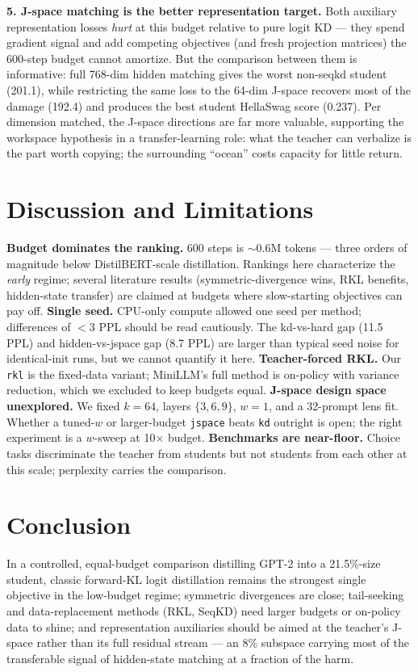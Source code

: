 \documentclass[11pt]{article}
\begin{document}
\textbf{5. J-space matching is the better representation target.} Both
auxiliary representation losses \emph{hurt} at this budget relative to
pure logit KD --- they spend gradient signal and add competing objectives
(and fresh projection matrices) the 600-step budget cannot amortize. But
the comparison between them is informative: full 768-dim hidden matching
gives the worst non-seqkd student (201.1), while restricting the same loss
to the 64-dim J-space recovers most of the damage (192.4) and produces
the best student HellaSwag score (0.237). Per dimension matched, the
J-space directions are far more valuable, supporting the workspace
hypothesis \cite{anthropic2026workspace} in a transfer-learning role:
what the teacher can verbalize is the part worth copying; the surrounding
``ocean'' costs capacity for little return.

\section{Discussion and Limitations}
\textbf{Budget dominates the ranking.} 600 steps is $\sim$0.6M tokens ---
three orders of magnitude below DistilBERT-scale distillation. Rankings
here characterize the \emph{early} regime; several literature results
(symmetric-divergence wins, RKL benefits, hidden-state transfer) are
claimed at budgets where slow-starting objectives can pay off.
\textbf{Single seed.} CPU-only compute allowed one seed per method;
differences of $<$3 PPL should be read cautiously. The kd-vs-hard gap
(11.5 PPL) and hidden-vs-jspace gap (8.7 PPL) are larger than typical
seed noise for identical-init runs, but we cannot quantify it here.
\textbf{Teacher-forced RKL.} Our \texttt{rkl} is the fixed-data variant;
MiniLLM's full method is on-policy with variance reduction, which we
excluded to keep budgets equal.
\textbf{J-space design space unexplored.} We fixed $k{=}64$, layers
$\{3,6,9\}$, $w{=}1$, and a 32-prompt lens fit. Whether a tuned-$w$ or
larger-budget \texttt{jspace} beats \texttt{kd} outright is open; the
right experiment is a $w$-sweep at 10$\times$ budget.
\textbf{Benchmarks are near-floor.} Choice tasks discriminate the teacher
from students but not students from each other at this scale; perplexity
carries the comparison.

\section{Conclusion}
In a controlled, equal-budget comparison distilling GPT-2 into a
21.5\%-size student, classic forward-KL logit distillation remains the
strongest single objective in the low-budget regime; symmetric
divergences are close; tail-seeking and data-replacement methods (RKL,
SeqKD) need larger budgets or on-policy data to shine; and representation
auxiliaries should be aimed at the teacher's J-space rather than its full
residual stream --- an 8\% subspace carrying most of the transferable
signal of hidden-state matching at a fraction of the harm.
\end{document}
